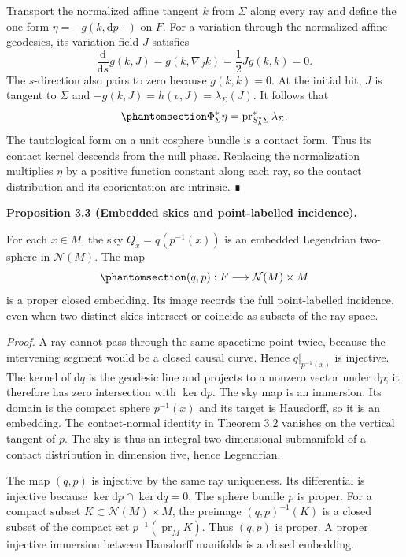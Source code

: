 \documentclass[
  english,
  11pt,
  reqno]{amsart}
\makeatletter
\newcommand{\pandocstatementheading}[1]{%
  \par\addpenalty{\@beginparpenalty}%
  \addvspace{.5\baselineskip plus .2\baselineskip minus .2\baselineskip}%
  {\normalfont\bfseries #1\par}%
  \nobreak\@afterindenttrue\@afterheading
}
\makeatother
\begin{document}
Transport the normalized affine tangent \(k\) from \(\Sigma\) along
every ray and define the one-form \(\eta=-g(k,\mathrm dp\,\cdot)\) on
\(F\). For a variation through the normalized affine geodesics, its
variation field \(J\) satisfies \[
\frac{\mathrm d}{\mathrm ds}g(k,J)
=g(k,\nabla_Jk)
=\frac12Jg(k,k)=0.
\] The \(s\)-direction also pairs to zero because \(g(k,k)=0\). At the
initial hit, \(J\) is tangent to \(\Sigma\) and
\(-g(k,J)=h(v,J)=\lambda_\Sigma(J)\). It follows that
\begin{equation}\protect\phantomsection\label{eq:global-contact-form-flow}{
\Phi_\Sigma^*\eta
=\operatorname{pr}_{S_h^*\Sigma}^*\lambda_\Sigma.
}\end{equation} The tautological form on a unit cosphere bundle is a
contact form. Thus its contact kernel descends from the null phase.
Replacing the normalization multiplies \(\eta\) by a positive function
constant along each ray, so the contact distribution and its
coorientation are intrinsic. ∎

\pandocstatementheading{\protect{}\label{prop:global-incidence-embedding}Proposition 3.3 (Embedded skies and point-labelled incidence).}

For each \(x\in M\), the sky \(Q_x=q(p^{-1}(x))\) is an embedded
Legendrian two-sphere in \(\mathcal N(M)\). The map
\begin{equation}\protect\phantomsection\label{eq:global-point-labelled-incidence}{
(q,p):F\longrightarrow\mathcal N(M)\times M
}\end{equation} is a proper closed embedding. Its image records the full
point-labelled incidence, even when two distinct skies intersect or
coincide as subsets of the ray space.

\emph{Proof.} A ray cannot pass through the same spacetime point twice,
because the intervening segment would be a closed causal curve. Hence
\(q|_{p^{-1}(x)}\) is injective. The kernel of \(\mathrm dq\) is the
geodesic line and projects to a nonzero vector under \(\mathrm dp\); it
therefore has zero intersection with \(\ker\mathrm dp\). The sky map is
an immersion. Its domain is the compact sphere \(p^{-1}(x)\) and its
target is Hausdorff, so it is an embedding. The contact-normal identity
in Theorem 3.2 vanishes on the vertical tangent of \(p\). The sky is
thus an integral two-dimensional submanifold of a contact distribution
in dimension five, hence Legendrian.

The map \((q,p)\) is injective by the same ray uniqueness. Its
differential is injective because
\(\ker\mathrm dp\cap\ker\mathrm dq=0\). The sphere bundle \(p\) is
proper. For a compact subset \(K\subset\mathcal N(M)\times M\), the
preimage \((q,p)^{-1}(K)\) is a closed subset of the compact set
\(p^{-1}(\operatorname{pr}_M K)\). Thus \((q,p)\) is proper. A proper
injective immersion between Hausdorff manifolds is a closed embedding.
\end{document}
